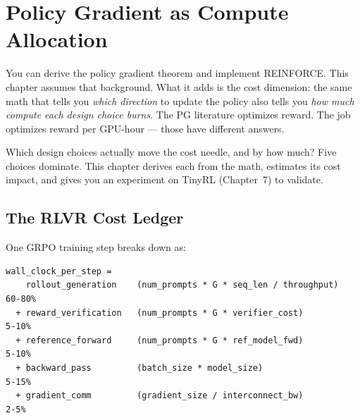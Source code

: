 \section{Policy Gradient as Compute Allocation}

\smallskip

\begin{whythis}
You can derive the policy gradient theorem and implement REINFORCE. This chapter assumes that background. What it adds is the cost dimension: the same math that tells you \textit{which direction} to update the policy also tells you \textit{how much compute each design choice burns}. The PG literature optimizes reward. The job optimizes reward per GPU-hour --- those have different answers.

Which design choices actually move the cost needle, and by how much? Five choices dominate. This chapter derives each from the math, estimates its cost impact, and gives you an experiment on TinyRL (Chapter~7) to validate.
\end{whythis}

\subsection{The RLVR Cost Ledger}

One GRPO training step breaks down as:

\begin{lstlisting}
wall_clock_per_step =
    rollout_generation    (num_prompts * G * seq_len / throughput)    60-80%
  + reward_verification   (num_prompts * G * verifier_cost)           5-10%
  + reference_forward     (num_prompts * G * ref_model_fwd)           5-10%
  + backward_pass         (batch_size * model_size)                    5-15%
  + gradient_comm         (gradient_size / interconnect_bw)            2-5%
\end{lstlisting}

\begin{center}
\end{center}

